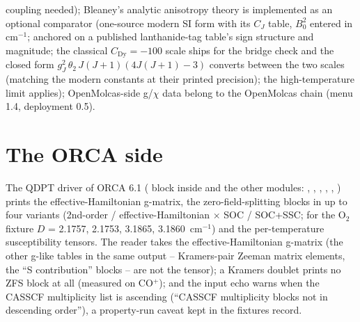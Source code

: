 \begin{readbox}
\begin{itemize}
    coupling needed); Bleaney's analytic anisotropy theory is implemented as
    an optional comparator (one-source modern SI form with its $C_J$ table,
    $B_0^2$ entered in cm$^{-1}$; anchored on a published lanthanide-tag
    table's sign structure and magnitude; the classical $C_{\mathrm{Dy}} =
    -100$ scale ships for the bridge check and the closed form
    $g_J^2\,\theta_2\,J(J+1)(4J(J+1)-3)$ converts between the two scales
    (matching the modern constants at their printed precision); the
    high-temperature limit applies); OpenMolcas-side g/$\chi$ data belong to the OpenMolcas chain
    (menu 1.4, deployment 0.5).
\end{itemize}
\end{readbox}

\section{The ORCA side}

The QDPT driver of ORCA 6.1 ( block inside  and the
other modules: , , , ,
, ) prints the effective-Hamiltonian
g-matrix, the zero-field-splitting blocks in up to four variants (2nd-order /
effective-Hamiltonian $\times$ SOC / SOC+SSC; for the O$_2$ fixture $D$ =
2.1757, 2.1753, 3.1865, 3.1860~cm$^{-1}$) and the per-temperature
susceptibility tensors.  The reader takes the effective-Hamiltonian g-matrix
(the other g-like tables in the same output -- Kramers-pair Zeeman matrix
elements, the ``S contribution'' blocks -- are not the tensor); a Kramers
doublet prints no ZFS block at all (measured on CO$^+$); and the input echo
warns when the CASSCF multiplicity list is ascending
(``CASSCF multiplicity blocks not in descending order''), a property-run
caveat kept in the fixtures record.
